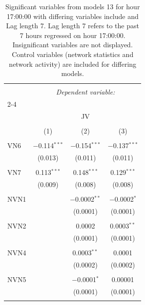 
\begin{table}[!htbp] \centering 
  \caption{Significant variables from models 13 for hour 17:00:00 with differing variables include 
                               and Lag length 7. Lag length 7 refers to the past 7 hours regressed on hour 17:00:00. 
                               Insignificant variables are not displayed. 
                               Control variables (network statistics and network activity) are 
                               included for differing models.} 
  \label{Jmodels2_t_hourlagged4} 
\scriptsize 
\begin{tabular}{@{\extracolsep{5pt}}lccc} 
\\[-1.8ex]\hline 
\hline \\[-1.8ex] 
 & \multicolumn{3}{c}{\textit{Dependent variable:}} \\ 
\cline{2-4} 
\\[-1.8ex] & \multicolumn{3}{c}{JV} \\ 
\\[-1.8ex] & (1) & (2) & (3)\\ 
\hline \\[-1.8ex] 
 VN6 & $-$0.114$^{***}$ & $-$0.154$^{***}$ & $-$0.137$^{***}$ \\ 
  & (0.013) & (0.011) & (0.011) \\ 
  & & & \\ 
 VN7 & 0.113$^{***}$ & 0.148$^{***}$ & 0.129$^{***}$ \\ 
  & (0.009) & (0.008) & (0.008) \\ 
  & & & \\ 
 NVN1 &  & $-$0.0002$^{**}$ & $-$0.0002$^{*}$ \\ 
  &  & (0.0001) & (0.0001) \\ 
  & & & \\ 
 NVN2 &  & 0.0002 & 0.0003$^{**}$ \\ 
  &  & (0.0001) & (0.0001) \\ 
  & & & \\ 
 NVN4 &  & 0.0003$^{**}$ & 0.0001 \\ 
  &  & (0.0002) & (0.0002) \\ 
  & & & \\ 
 NVN5 &  & $-$0.0001$^{*}$ & 0.00001 \\ 
  &  & (0.0001) & (0.0001) \\ 
  & & & \\ 

\end{tabular}
\end{table}
